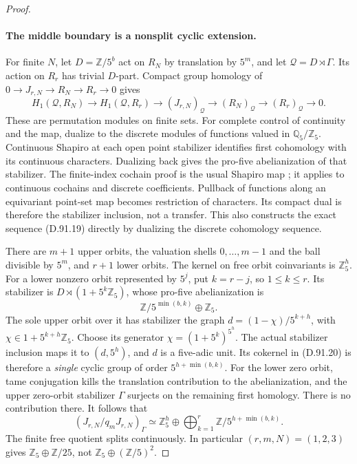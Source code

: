 \begin{proof}
\paragraph{The middle boundary is a nonsplit cyclic extension.}
For finite \(N\), let \(D=\mathbb Z/5^b\) act on
\(R_N\) by translation by \(5^m\), and let
\(\mathcal Q=D\rtimes\Gamma\). Its action on \(R_r\)
has trivial \(D\)-part. Compact group homology of
\(0\to J_{r,N}\to R_N\to R_r\to0\) gives
\[
 H_1(\mathcal Q,R_N)\longrightarrow H_1(\mathcal Q,R_r)
 \longrightarrow (J_{r,N})_{\mathcal Q}
 \longrightarrow (R_N)_{\mathcal Q}\longrightarrow(R_r)_{\mathcal Q}
 \longrightarrow0.                                           \tag{D.91.19}
\]
These are permutation modules on finite sets. For complete
control of continuity and the map, dualize to the discrete
modules of functions valued in \(\mathbb Q_5/\mathbb Z_5\).
Continuous Shapiro at each open point stabilizer identifies
first cohomology with its continuous characters. Dualizing
back gives the pro-five abelianization of that stabilizer.
The finite-index cochain proof is the usual Shapiro map
\cite[II, Proposition 1.11 and Example 1.27(a)]{PBC_MilneCFT};
it applies to continuous cochains and discrete coefficients.
Pullback of functions along an equivariant point-set map
becomes restriction of characters. Its compact dual is
therefore the stabilizer inclusion, not a transfer. This
also constructs the exact sequence (D.91.19) directly by
dualizing the discrete cohomology sequence.

There are \(m+1\) upper orbits, the valuation shells
\(0,\ldots,m-1\) and the ball divisible by \(5^m\),
and \(r+1\) lower orbits. The kernel on free orbit
coinvariants is \(\mathbb Z_5^h\). For a lower nonzero
orbit represented by \(5^j\), put \(k=r-j\), so
\(1\le k\le r\). Its stabilizer is
\(D\rtimes(1+5^k\mathbb Z_5)\), whose pro-five
abelianization is
\[
             \mathbb Z/5^{\min(b,k)}\oplus\mathbb Z_5.
                                                               \tag{D.91.20}
\]
The sole upper orbit over it has stabilizer the graph
\(d=(1-\chi)/5^{k+h}\), with
\(\chi\in1+5^{k+h}\mathbb Z_5\). Choose its generator
\(\chi=(1+5^k)^{5^h}\). The actual stabilizer inclusion
maps it to \((d,5^h)\), and \(d\) is a five-adic unit.
Its cokernel in (D.91.20) is therefore a \emph{single}
cyclic group of order \(5^{h+\min(b,k)}\).
For the lower zero orbit, tame conjugation kills the
translation contribution to the abelianization, and the
upper zero-orbit stabilizer \(\Gamma\) surjects on the
remaining first homology. There is no contribution there.
It follows that
\[
 (J_{r,N}/q_mJ_{r,N})_\Gamma
       \simeq\mathbb Z_5^h\oplus
                       \bigoplus_{k=1}^r\mathbb Z/5^{h+\min(b,k)}.
                                                               \tag{D.91.21}
\]
The finite free quotient splits continuously. In particular
\((r,m,N)=(1,2,3)\) gives \(\mathbb Z_5\oplus\mathbb Z/25\),
not \(\mathbb Z_5\oplus(\mathbb Z/5)^2\).


\end{proof}
